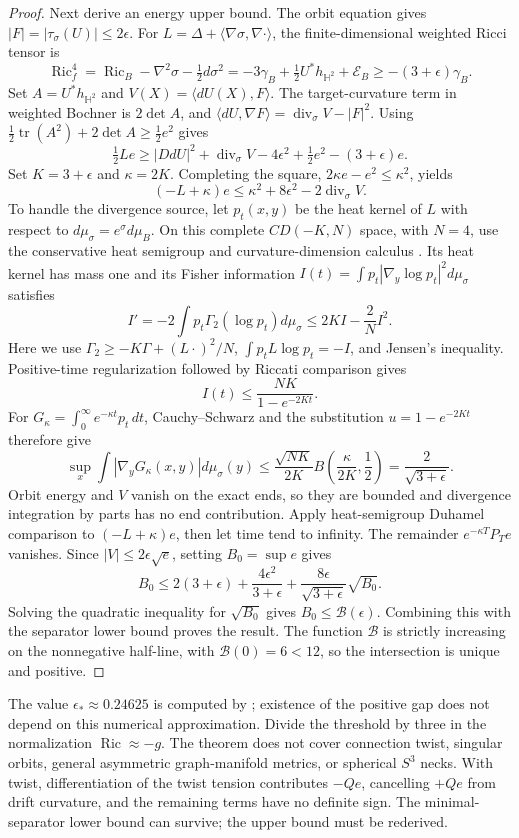 \documentclass[a4paper,11pt]{article}
\numberwithin{equation}{section}
\theoremstyle{definition}
\newcommand{\Ric}{\operatorname{Ric}}
\newcommand{\tr}{\operatorname{tr}}
\begin{document}
\begin{proof}
Next derive an energy upper bound.
The orbit equation gives $|F|=|\tau_\sigma(U)|\le2\epsilon$.
For $L=\Delta+\langle\nabla\sigma,\nabla\cdot\rangle$, the finite-dimensional weighted Ricci tensor is
\[
 \Ric^4_f=\Ric_B-\nabla^2\sigma-\tfrac12d\sigma^2
 =-3\gamma_B+\tfrac12U^*h_{\mathbb H^2}+\mathcal E_B
 \ge-(3+\epsilon)\gamma_B.
\]
Set $A=U^*h_{\mathbb H^2}$ and $V(X)=\langle dU(X),F\rangle$.
The target-curvature term in weighted Bochner is $2\det A$, and
$\langle dU,\nabla F\rangle=\operatorname{div}_\sigma V-|F|^2$.
Using $\frac12\tr(A^2)+2\det A\ge\frac12e^2$ gives
\[
 \tfrac12Le\ge |DdU|^2+\operatorname{div}_\sigma V
   -4\epsilon^2+\tfrac12e^2-(3+\epsilon)e.
\]
Set $K=3+\epsilon$ and $\kappa=2K$. Completing the square, $2\kappa e-e^2\le\kappa^2$, yields
\[
 (-L+\kappa)e\le\kappa^2+8\epsilon^2
                 -2\operatorname{div}_\sigma V.
\]
To handle the divergence source, let $p_t(x,y)$ be the heat kernel of $L$ with respect to $d\mu_\sigma=e^\sigma d\mu_B$.
On this complete $CD(-K,N)$ space, with $N=4$, use the conservative heat semigroup and curvature-dimension calculus \cite{BakryGentilLedoux}. Its heat kernel has mass one and its Fisher information
$I(t)=\int p_t|\nabla_y\log p_t|^2d\mu_\sigma$ satisfies
\[
 I'=-2\int p_t\Gamma_2(\log p_t)d\mu_\sigma
 \le2KI-\frac2N I^2.
\]
Here we use $\Gamma_2\ge-K\Gamma+(L\cdot)^2/N$,
$\int p_tL\log p_t=-I$, and Jensen's inequality.
Positive-time regularization followed by Riccati comparison gives
\[
 I(t)\le\frac{NK}{1-e^{-2Kt}}.
\]
For $G_\kappa=\int_0^\infty e^{-\kappa t}p_t\,dt$, Cauchy--Schwarz and the substitution $u=1-e^{-2Kt}$ therefore give
\[
 \sup_x\int|\nabla_yG_\kappa(x,y)|d\mu_\sigma(y)
 \le\frac{\sqrt{NK}}{2K}
       B\!\left(\frac{\kappa}{2K},\frac12\right)
 =\frac2{\sqrt{3+\epsilon}}.
\]
Orbit energy and $V$ vanish on the exact ends, so they are bounded and divergence integration by parts has no end contribution.
Apply heat-semigroup Duhamel comparison to $(-L+\kappa)e$, then let time tend to infinity.
The remainder $e^{-\kappa T}P_Te$ vanishes.
Since $|V|\le2\epsilon\sqrt e$, setting $B_0=\sup e$ gives
\[
 B_0\le2(3+\epsilon)+\frac{4\epsilon^2}{3+\epsilon}
            +\frac{8\epsilon}{\sqrt{3+\epsilon}}\sqrt{B_0}.
\]
Solving the quadratic inequality for $\sqrt{B_0}$ gives $B_0\le\mathcal B(\epsilon)$.
Combining this with the separator lower bound proves the result.
The function $\mathcal B$ is strictly increasing on the nonnegative half-line, with $\mathcal B(0)=6<12$, so the intersection is unique and positive.
\end{proof}
The value $\epsilon_*\approx0.24625$ is computed by ; existence of the positive gap does not depend on this numerical approximation.
Divide the threshold by three in the normalization $\Ric\approx-g$.
The theorem does not cover connection twist, singular orbits, general asymmetric graph-manifold metrics, or spherical $S^3$ necks.
With twist, differentiation of the twist tension contributes $-Qe$, cancelling $+Qe$ from drift curvature, and the remaining terms have no definite sign.
The minimal-separator lower bound can survive; the upper bound must be rederived.
\end{document}
